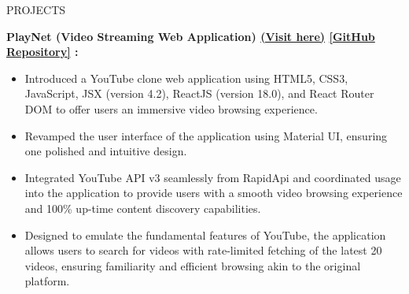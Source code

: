 \documentclass{resume} %
\begin{document}
\begin{rSection}{PROJECTS}
    \item \textbf{PlayNet (Video Streaming Web Application)
    {\href{https://play-net-eight.vercel.app/}{(Visit here)}}
    {\href{https://github.com/arkapg211002/PlayNet}{[GitHub Repository]}} :} 
    \vspace{-0.6em}
    \begin{itemize}
    \setlength\itemsep{-0.6em}
     \item Introduced  a  YouTube  clone  web  application  using  HTML5,  CSS3,  JavaScript,  JSX  (version  4.2),  ReactJS (version 18.0), and React Router DOM to offer users an immersive video browsing experience.
    \item Revamped the user interface of the application using Material UI, ensuring one polished and intuitive design.
    \item Integrated  YouTube  API  v3  seamlessly from RapidApi and coordinated usage into  the  application  to  provide  users  with  a  smooth  video  browsing experience and 100\% up-time content discovery capabilities.
    \item Designed  to  emulate  the  fundamental  features  of  YouTube,  the  application  allows  users  to  search  for  videos with rate-limited fetching of the latest 20 videos, ensuring familiarity and efficient browsing akin to the original platform.
    \end{itemize}

\end{rSection}
\end{document}
